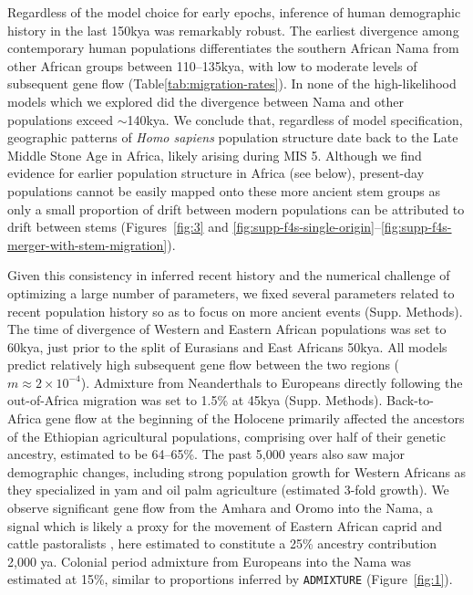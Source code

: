 \documentclass{article}
\begin{document}
Regardless of the model choice for early epochs, inference of human demographic
history in the last 150kya was remarkably robust. The earliest divergence among
contemporary human populations differentiates the southern African Nama from
other African groups between 110--135kya, with low to moderate levels of
subsequent gene flow (Table\ref{tab:migration-rates}). In none of the
high-likelihood models which we explored did the divergence between Nama and
other populations exceed $\sim$140kya. We conclude that, regardless of model
specification, geographic patterns of \emph{Homo sapiens} population structure
date back to the Late Middle Stone Age in Africa, likely arising during MIS 5.
Although we find evidence for earlier population structure in Africa (see
below), present-day populations cannot be easily mapped onto these more ancient
stem groups as only a small proportion of drift between modern populations can
be attributed to drift between stems (Figures~\ref{fig:3} and
\ref{fig:supp-f4s-single-origin}--\ref{fig:supp-f4s-merger-with-stem-migration}). 

Given this consistency in inferred recent history and the numerical challenge
of optimizing a large number of parameters, we fixed several parameters related
to recent population history so as to focus on more ancient events (Supp.
Methods). The time of divergence of Western and Eastern African populations was
set to 60kya, just prior to the split of Eurasians and East Africans 50kya. All
models predict relatively high subsequent gene flow between the two regions
($m\approx2\times10^{-4}$). Admixture from Neanderthals to Europeans directly
following the out-of-Africa migration was set to 1.5\% at 45kya (Supp.
Methods). Back-to-Africa gene flow at the beginning of the Holocene primarily
affected the ancestors of the Ethiopian agricultural populations, comprising
over half of their genetic ancestry, estimated to be 64--65\%. The past 5,000
years also saw major demographic changes, including strong population growth
for Western Africans as they specialized in yam and oil palm agriculture
(estimated 3-fold growth). We observe significant gene flow from the Amhara and
Oromo into the Nama, a signal which is likely a proxy for the movement of
Eastern African caprid and cattle pastoralists
\citep{Henn2008-xo,Breton2014-xb}, here estimated to constitute a 25\% ancestry
contribution 2,000 ya. Colonial period admixture from Europeans into the Nama
was estimated at 15\%, similar to proportions inferred by \texttt{ADMIXTURE}
\citep{Alexander2009-sw} (Figure~\ref{fig:1}).
\end{document}
